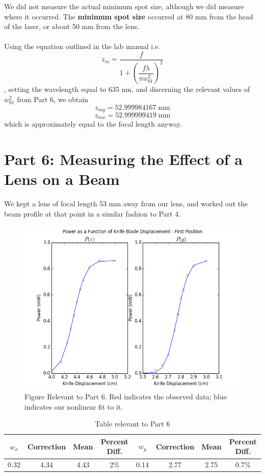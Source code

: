 \documentclass[10pt,a4paper]{article}
\begin{document}
\noindent We did not measure the actual minimum spot size, although we did measure where it occurred. The \textbf{minimum spot size} occurred at 80 mm from the head of the laser, or about 50 mm from the lens.\\
\\
Using the equation outlined in the lab manual i.e. $$z_{m} = \dfrac{f}{1 + \left(\dfrac{f\lambda}{\pi w_{01}^{2}}\right)^{2}} $$
, setting the wavelength equal to 635 nm, and discerning the relevant values of $w_{01}^{2}$ from Part 6, we obtain 
$$z_{my} = 52.999984167\;\mathrm{mm}$$
$$z_{mx} = 52.999999419\;\mathrm{mm}$$
which is approximately equal to the focal length anyway.

\section*{Part 6: Measuring the Effect of a Lens on a Beam}
We kept a lens of focal length 53 mm away from our lens, and worked out the beam profile at that point in a similar fashion to Part 4. 
\begin{figure}[h]
\centering
\includegraphics[scale =0.8]{../Analysis/figure_7.png}
\caption{Figure Relevant to Part 6. Red indicates the observed data; blue indicates our nonlinear fit to it.}
\end{figure}
\begin{table}[H]
\centering
\begin{tabular}{|c|c|c|c|c|c|c|c|}
\hline 
$w_{x}$ & Correction & Mean & Percent Diff. & $w_{y}$ & Correction & Mean & Percent Diff. \\ 
\hline 
0.32 & 4.34 & 4.43 & 2\% & 0.14 & 2.77 & 2.75 & 0.7\% \\ 
\hline 
\end{tabular}
\caption{Table relevant to Part 6}
\end{table}
\end{document}
